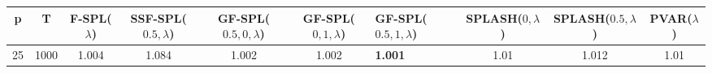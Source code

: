 \begin{tabular}{cccccclccc}
\hline
  p  &  T   &  F-SPL($\lambda$)  &  SSF-SPL($0.5, \lambda$)  &  GF-SPL($0.5, 0, \lambda$)  &  GF-SPL($0, 1, \lambda$)  & GF-SPL($0.5, 1, \lambda$)   &  SPLASH($0, \lambda$)  &  SPLASH($0.5, \lambda$)  &  PVAR($\lambda$)  \\
\hline
 25  & 1000 &       1.004        &           1.084           &            1.002            &           1.002           & \textbf{1.001}              &          1.01          &          1.012           &       1.01        \\
\hline
\end{tabular}